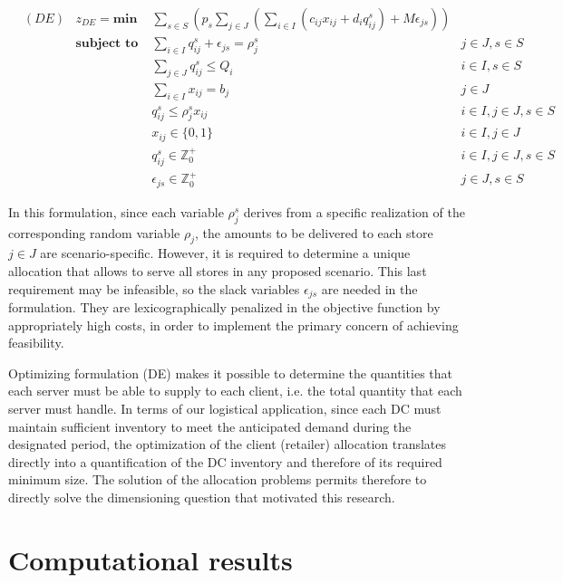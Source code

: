 \documentclass[ijoc,sglanonrev]{informs4}
\begin{document}
\begin{align}
&(DE) & z_{DE} = \textbf{min } & \sum_{s \in S} \left( p_s \sum_{j \in J} \left( \sum_{i \in I} ( c_{ij}x_{ij} + d_i q_{ij}^s) + M \epsilon_{js} \right) \right) \label{DEobj}\\
& &  \textbf{subject to }
     & \sum_{i \in I} q_{ij}^s + \epsilon_{js} = \rho_j^s & j \in J, s \in S \label{DErequest}\\
& &  & \sum_{j \in J}q_{ij}^s \leq Q_i & i \in I, s \in S \label{DEcapacity}\\
& &  & \sum_{i \in I} x_{ij} = b_j & j \in J  \label{DEnumserv}\\
& &  & q_{ij}^s \leq \rho_j^s x_{ij} & i \in I, j \in J, s \in S \label{DEcontin}\\
& &  & x_{ij} \in \{0,1\} & i\in I, j \in J \label{DEx}\\
& &  & q_{ij}^s \in \mathbb{Z}^+_0 & i\in I, j \in J, s \in S \label{DEq}\\
& &  & \epsilon_{js} \in \mathbb{Z}^+_0 & j \in J, s \in S \label{DEeps}
\end{align}

In this formulation, since each variable $\rho_j^s$ derives from a specific realization of the corresponding random variable $\rho_j$, the amounts to be delivered to each store $j \in J$ are scenario-specific. However, it is required to determine a unique allocation that allows to serve all stores in any proposed scenario. This last requirement may be infeasible, so the slack variables $\epsilon_{js}$ are needed in the formulation. They are lexicographically penalized in the objective function by appropriately high costs, in order to implement the primary concern of achieving feasibility.

Optimizing formulation (DE) makes it possible to determine the quantities that each server must be able to supply to each client, i.e. the total quantity that each server must handle. 
In terms of our logistical application, since each DC must maintain sufficient inventory to meet the anticipated demand during the designated period, the optimization of the client (retailer) allocation translates directly into a quantification of the DC inventory and therefore of its required minimum size. The solution of the allocation problems permits therefore to directly solve the dimensioning question that motivated this research.

\section{Computational results} \label{Sec:results}
\end{document}

